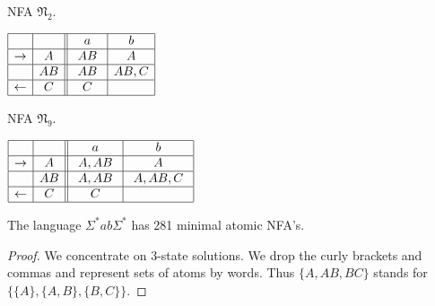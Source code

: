 \documentclass{llncs}
\newcommand{\Sig}{\Sigma}
\newcommand{\fN}{{\mathfrak N}}
\begin{document}
\begin{example}
\begin{table}[hbt]
\begin{minipage}[b]{0.45\linewidth}
\caption{NFA $\fN_2$.}
\label{tab:fn1}
\begin{center}
$
\begin{array}{|c| c||c| c| }    
\hline
& \ \  \ \ 
&\ \ a \ \ &\ \ b \ \ \\
\hline  
\rightarrow & A
& \ AB \ & \ A \ \\
\hline  
 & AB
&  AB  & AB,C \\
\hline  
\leftarrow & \ C \
 & \ C \ & \  \ \\
\hline  
\end{array}
$
\end{center}
\end{minipage}
\hspace{0.2cm}
\begin{minipage}[b]{0.45\linewidth}
\caption{NFA $\fN_9$.}
\label{tab:fn9}
\begin{center}
$
\begin{array}{|c| c||c| c| c|c|}    
\hline
& \ \  \ \ 
&\ \ a \ \ &\ \ b \ \   \\
\hline  
\rightarrow & \ A \
&  \ A,AB \  &  \  A  \   \\
\hline  
 & AB
&  \  A,AB \  & \ A,AB,C \ \\
\hline  
\leftarrow & C
&   \ C  \  &      \\
\hline  
\end{array}
$
\end{center}
\end{minipage}
\end{table}

\begin{proposition} 
\label{prop:281}
The language $\Sig^*ab\Sig^*$ has 281 minimal atomic NFA's. 
\end{proposition}
\begin{proof}
We concentrate on 3-state solutions. 
We drop the curly brackets and commas and represent sets of atoms by words. Thus $\{A,AB
,BC\}$ stands for 
$\{ \{A\}, \{A,B\},\{B,C\} \}$.


\end{proof}
\end{example}
\end{document}
